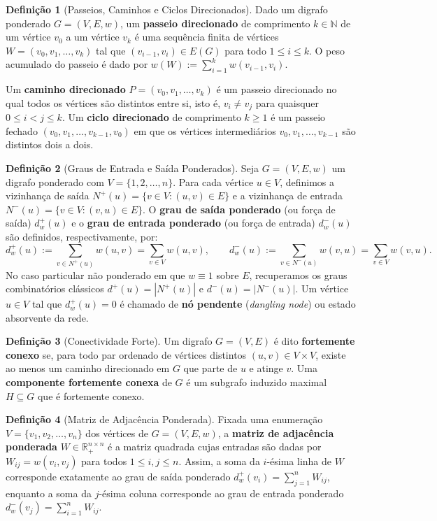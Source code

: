 \documentclass[10pt,a4paper]{article}
\theoremstyle{definition}
\newtheorem{definicao}{Definição}[section]
\theoremstyle{plain}
\theoremstyle{remark}
\begin{document}
\begin{definicao}[Passeios, Caminhos e Ciclos Direcionados]
Dado um digrafo ponderado $G = (V, E, w)$, um \textbf{passeio direcionado} de comprimento $k \in \mathbb{N}$ de um vértice $v_0$ a um vértice $v_k$ é uma sequência finita de vértices $W = (v_0, v_1, \dots, v_k)$ tal que $(v_{i-1}, v_i) \in E(G)$ para todo $1 \le i \le k$. O peso acumulado do passeio é dado por $w(W) := \sum_{i=1}^{k} w(v_{i-1}, v_i)$.

Um \textbf{caminho direcionado} $P = (v_0, v_1, \dots, v_k)$ é um passeio direcionado no qual todos os vértices são distintos entre si, isto é, $v_i \neq v_j$ para quaisquer $0 \le i < j \le k$. Um \textbf{ciclo direcionado} de comprimento $k \ge 1$ é um passeio fechado $(v_0, v_1, \dots, v_{k-1}, v_0)$ em que os vértices intermediários $v_0, v_1, \dots, v_{k-1}$ são distintos dois a dois.
\end{definicao}

\begin{definicao}[Graus de Entrada e Saída Ponderados]
Seja $G = (V, E, w)$ um digrafo ponderado com $V = \{1, 2, \dots, n\}$. Para cada vértice $u \in V$, definimos a vizinhança de saída $N^{+}(u) = \{v \in V : (u, v) \in E\}$ e a vizinhança de entrada $N^{-}(u) = \{v \in V : (v, u) \in E\}$. O \textbf{grau de saída ponderado} (ou força de saída) $d^{+}_{w}(u)$ e o \textbf{grau de entrada ponderado} (ou força de entrada) $d^{-}_{w}(u)$ são definidos, respectivamente, por:
\[
d^{+}_{w}(u) := \sum_{v \in N^{+}(u)} w(u, v) = \sum_{v \in V} w(u, v), \qquad d^{-}_{w}(u) := \sum_{v \in N^{-}(u)} w(v, u) = \sum_{v \in V} w(v, u).
\]
No caso particular não ponderado em que $w \equiv 1$ sobre $E$, recuperamos os graus combinatórios clássicos $d^{+}(u) = |N^{+}(u)|$ e $d^{-}(u) = |N^{-}(u)|$. Um vértice $u \in V$ tal que $d^{+}_{w}(u) = 0$ é chamado de \textbf{nó pendente} (\textit{dangling node}) ou estado absorvente da rede.
\end{definicao}

\begin{definicao}[Conectividade Forte]
Um digrafo $G = (V, E)$ é dito \textbf{fortemente conexo} se, para todo par ordenado de vértices distintos $(u, v) \in V \times V$, existe ao menos um caminho direcionado em $G$ que parte de $u$ e atinge $v$. Uma \textbf{componente fortemente conexa} de $G$ é um subgrafo induzido maximal $H \subseteq G$ que é fortemente conexo.
\end{definicao}

\begin{definicao}[Matriz de Adjacência Ponderada]
Fixada uma enumeração $V = \{v_1, v_2, \dots, v_n\}$ dos vértices de $G = (V, E, w)$, a \textbf{matriz de adjacência ponderada} $W \in \mathbb{R}^{n \times n}_{+}$ é a matriz quadrada cujas entradas são dadas por $W_{ij} = w(v_i, v_j)$ para todos $1 \le i, j \le n$. Assim, a soma da $i$-ésima linha de $W$ corresponde exatamente ao grau de saída ponderado $d^{+}_{w}(v_i) = \sum_{j=1}^{n} W_{ij}$, enquanto a soma da $j$-ésima coluna corresponde ao grau de entrada ponderado $d^{-}_{w}(v_j) = \sum_{i=1}^{n} W_{ij}$.
\end{definicao}
\end{document}
